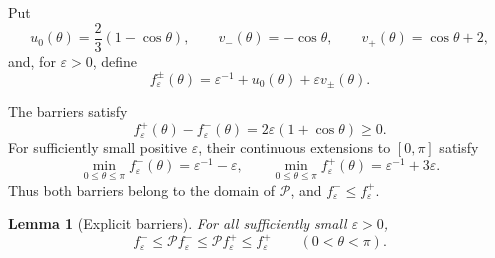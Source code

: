\documentclass[11pt]{article}
\newtheorem{lemma}[theorem]{Lemma}
\theoremstyle{remark}
\newcommand{\eps}{\varepsilon}
\begin{document}
Put
\[
   u_0(\theta)=\frac23(1-\cos\theta),
   \qquad
   v_-(\theta)=-\cos\theta,
   \qquad
   v_+(\theta)=\cos\theta+2,
\]
and, for \(\eps>0\), define
\begin{equation}\label{eq:barriers}
   f_\eps^\pm(\theta)
      =\eps^{-1}+u_0(\theta)+\eps v_\pm(\theta).
\end{equation}

The barriers satisfy
\[
   f_\eps^+(\theta)-f_\eps^-(\theta)
      =2\eps(1+\cos\theta)\geq0.
\]
For sufficiently small positive \(\eps\), their continuous extensions to
\([0,\pi]\) satisfy
\[
   \min_{0\leq\theta\leq\pi} f_\eps^-(\theta)
      =\eps^{-1}-\eps,
   \qquad
   \min_{0\leq\theta\leq\pi} f_\eps^+(\theta)
      =\eps^{-1}+3\eps.
\]
Thus both barriers belong to the domain of \(\mathcal P\), and
\(f_\eps^-\leq f_\eps^+\).

\begin{lemma}[Explicit barriers]\label{lem:barriers}
For all sufficiently small \(\eps>0\),
\begin{equation}\label{eq:barrier-ineq}
   f_\eps^-\leq\mathcal Pf_\eps^-
   \leq\mathcal Pf_\eps^+\leq f_\eps^+
   \qquad(0<\theta<\pi).
\end{equation}
\end{lemma}
\end{document}
